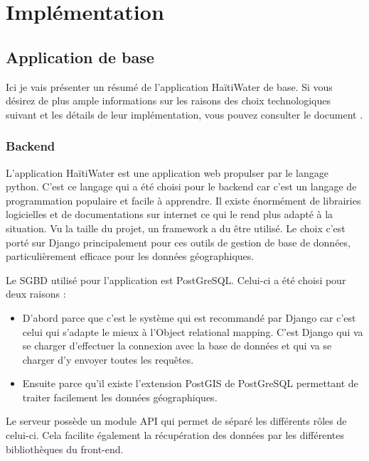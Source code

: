 \documentclass{EPL-master-thesis-covers-FR}
\begin{document}
			




	\chapter{Implémentation}

		\section{Application de base}
			Ici je vais présenter un résumé de l'application HaïtiWater de base. Si vous désirez de plus ample informations sur les raisons des choix technologiques suivant et les détails de leur implémentation, vous pouvez consulter le document \cite{ref:haitiwater}.
			
			\subsection*{Backend}
				L'application HaïtiWater est une application web propulser par le langage python. C'est ce langage qui a été choisi pour le backend car c'est un langage de programmation populaire et facile à apprendre. Il existe énormément de librairies logicielles et de documentations sur internet ce qui le rend plus adapté à la situation. Vu la taille du projet, un framework a du être utilisé. Le choix c'est porté sur Django principalement pour ces outils de gestion de base de données, particulièrement efficace pour les données géographiques.	
			
				Le SGBD utilisé pour l'application est PostGreSQL. Celui-ci a été choisi pour deux raisons :
				\begin{itemize}
					\item D'abord parce que c'est le système qui est recommandé par Django car c'est celui qui s'adapte le mieux à l'Object relational mapping. C'est Django qui va se charger d'effectuer la connexion avec la base de données et qui va se charger d'y envoyer toutes les requêtes.
					\item Ensuite parce qu'il existe l'extension PostGIS de PostGreSQL permettant de traiter facilement les données géographiques.
				\end{itemize}			
				
				Le serveur possède un module API qui permet de séparé les différents rôles de celui-ci. Cela facilite également la récupération des données par les différentes bibliothèques du front-end.
						
\end{document}

